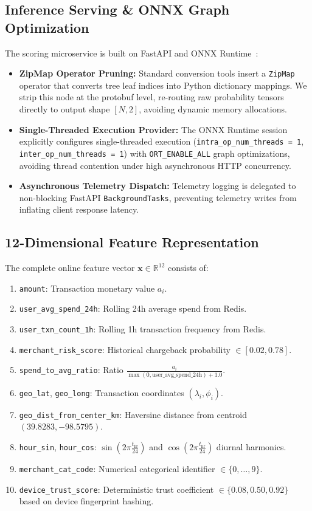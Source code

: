 \subsection{Inference Serving \& ONNX Graph Optimization}
The scoring microservice is built on FastAPI and ONNX Runtime~\cite{bai2019onnx}:
\begin{itemize}
    \item \textbf{ZipMap Operator Pruning:} Standard conversion tools insert a \texttt{ZipMap} operator that converts tree leaf indices into Python dictionary mappings. We strip this node at the protobuf level, re-routing raw probability tensors directly to output shape $[N, 2]$, avoiding dynamic memory allocations.
    \item \textbf{Single-Threaded Execution Provider:} The ONNX Runtime session explicitly configures single-threaded execution (\texttt{intra\_op\_num\_threads = 1}, \texttt{inter\_op\_num\_threads = 1}) with \texttt{ORT\_ENABLE\_ALL} graph optimizations, avoiding thread contention under high asynchronous HTTP concurrency.
    \item \textbf{Asynchronous Telemetry Dispatch:} Telemetry logging is delegated to non-blocking FastAPI \texttt{BackgroundTasks}, preventing telemetry writes from inflating client response latency.
\end{itemize}

\subsection{12-Dimensional Feature Representation}
The complete online feature vector $\mathbf{x} \in \mathbb{R}^{12}$ consists of:
\begin{enumerate}
    \item \texttt{amount}: Transaction monetary value $a_i$.
    \item \texttt{user\_avg\_spend\_24h}: Rolling 24h average spend from Redis.
    \item \texttt{user\_txn\_count\_1h}: Rolling 1h transaction frequency from Redis.
    \item \texttt{merchant\_risk\_score}: Historical chargeback probability $\in [0.02, 0.78]$.
    \item \texttt{spend\_to\_avg\_ratio}: Ratio $\frac{a_i}{\max(0, \text{user\_avg\_spend\_24h}) + 1.0}$.
    \item \texttt{geo\_lat}, \texttt{geo\_long}: Transaction coordinates $(\lambda_i, \phi_i)$.
    \item \texttt{geo\_dist\_from\_center\_km}: Haversine distance from centroid $(39.8283, -98.5795)$.
    \item \texttt{hour\_sin}, \texttt{hour\_cos}: $\sin\left(2\pi \frac{t_{\text{hr}}}{24}\right)$ and $\cos\left(2\pi \frac{t_{\text{hr}}}{24}\right)$ diurnal harmonics.
    \item \texttt{merchant\_cat\_code}: Numerical categorical identifier $\in \{0, \dots, 9\}$.
    \item \texttt{device\_trust\_score}: Deterministic trust coefficient $\in \{0.08, 0.50, 0.92\}$ based on device fingerprint hashing.
\end{enumerate}
